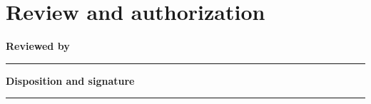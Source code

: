 \documentclass[10pt,letterpaper]{article}
\begin{document}
\section{Review and authorization}
\textbf{Reviewed by}\par
\noindent\rule{\linewidth}{0.35pt}\par\vspace{0.7em}
\textbf{Disposition and signature}\par
\noindent\rule{\linewidth}{0.35pt}\par\vspace{0.7em}
\end{document}
